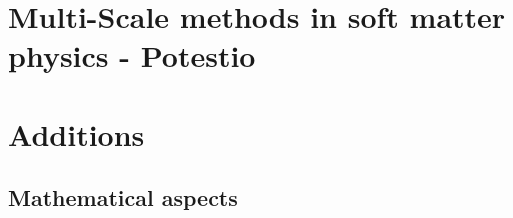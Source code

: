   \part{Multi-Scale methods in soft matter physics - Potestio}
  
  
  \part{Additions}
  \chapter{Mathematical aspects}
  
  
  
  
  
  


